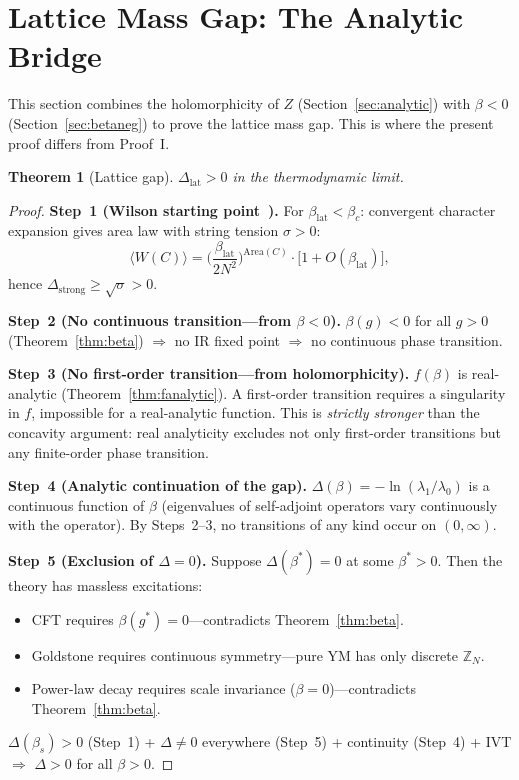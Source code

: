 \documentclass[12pt,a4paper]{article}
\theoremstyle{plain}
\newtheorem{theorem}{Theorem}[section]
\theoremstyle{definition}
\theoremstyle{remark}
\begin{document}

\section{Lattice Mass Gap: The Analytic Bridge}\label{sec:latgap}

This section combines the holomorphicity of $Z$ (Section~\ref{sec:analytic}) with $\beta<0$ (Section~\ref{sec:betaneg}) to prove the lattice mass gap. This is where the present proof differs from Proof~I.

\begin{theorem}[Lattice gap]\label{thm:latgap}
$\Delta_{\mathrm{lat}}>0$ in the thermodynamic limit.
\end{theorem}

\begin{proof}
\textbf{Step~1 (Wilson starting point~\cite{Wilson1974}).} For $\beta_{\mathrm{lat}}<\beta_c$: convergent character expansion gives area law with string tension $\sigma>0$:
\begin{equation}\label{eq:wilson}
\langle W(C)\rangle = \bigg(\frac{\beta_{\mathrm{lat}}}{2N^2}\bigg)^{\!\mathrm{Area}(C)}\!\cdot\big[1+O(\beta_{\mathrm{lat}})\big],
\end{equation}
hence $\Delta_{\mathrm{strong}}\geq\sqrt{\sigma}>0$.

\textbf{Step~2 (No continuous transition---from $\beta<0$).} $\beta(g)<0$ for all $g>0$ (Theorem~\ref{thm:beta}) $\Rightarrow$ no IR fixed point $\Rightarrow$ no continuous phase transition.

\textbf{Step~3 (No first-order transition---from holomorphicity).} $f(\beta)$ is real-analytic (Theorem~\ref{thm:fanalytic}). A first-order transition requires a singularity in $f$, impossible for a real-analytic function. This is \emph{strictly stronger} than the concavity argument: real analyticity excludes not only first-order transitions but any finite-order phase transition.

\textbf{Step~4 (Analytic continuation of the gap).} $\Delta(\beta)=-\ln(\lambda_1/\lambda_0)$ is a continuous function of $\beta$ (eigenvalues of self-adjoint operators vary continuously with the operator). By Steps~2--3, no transitions of any kind occur on $(0,\infty)$.

\textbf{Step~5 (Exclusion of $\Delta=0$).} Suppose $\Delta(\beta^*)=0$ at some $\beta^*>0$. Then the theory has massless excitations:
\begin{itemize}[nosep]
\item CFT requires $\beta(g^*)=0$---contradicts Theorem~\ref{thm:beta}.
\item Goldstone requires continuous symmetry---pure YM has only discrete $\mathbb{Z}_N$.
\item Power-law decay requires scale invariance ($\beta=0$)---contradicts Theorem~\ref{thm:beta}.
\end{itemize}

$\Delta(\beta_s)>0$ (Step~1) + $\Delta\neq 0$ everywhere (Step~5) + continuity (Step~4) + IVT $\Rightarrow$ $\Delta>0$ for all $\beta>0$.
\end{proof}
\end{document}
